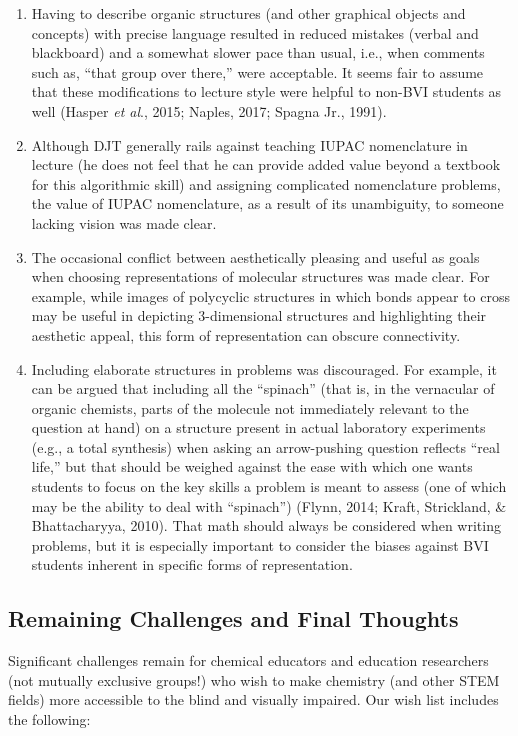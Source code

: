 \documentclass[11.5pt]{sig-alternate} %
\begin{document}
\begin{large}
\begin{enumerate}
    \item Having to describe organic structures (and other graphical objects and concepts) with precise language resulted in reduced mistakes (verbal and blackboard) and a somewhat slower pace than usual, i.e., when comments such as, “that group over there,” were acceptable. It seems fair to assume that these modifications to lecture style were helpful to non-BVI students as well (Hasper \textit{et al}., 2015; Naples, 2017; Spagna Jr., 1991).
    \item Although DJT generally rails against teaching IUPAC nomenclature in lecture (he does not feel that he can provide added value beyond a textbook for this algorithmic skill) and assigning complicated nomenclature problems, the value of IUPAC nomenclature, as a result of its unambiguity, to someone lacking vision was made clear.
    \item The occasional conflict between aesthetically pleasing and useful as goals when choosing representations of molecular structures was made clear. For example, while images of polycyclic structures in which bonds appear to cross may be useful in depicting 3-dimensional structures and highlighting their aesthetic appeal, this form of representation can obscure connectivity.
    \item Including elaborate structures in problems was discouraged. For example, it can be argued that including all the “spinach” (that is, in the vernacular of organic chemists, parts of the molecule not immediately relevant to the question at hand) on a structure present in actual laboratory experiments (e.g., a total synthesis) when asking an arrow-pushing question reflects “real life,” but that should be weighed against the ease with which one wants students to focus on the key skills a problem is meant to assess (one of which may be the ability to deal with “spinach”) (Flynn, 2014; Kraft, Strickland, \& Bhattacharyya, 2010). That math should always be considered when writing problems, but it is especially important to consider the biases against BVI students inherent in specific forms of representation.
 \end{enumerate}

\subsection*{Remaining Challenges and Final Thoughts}

Significant challenges remain for chemical educators and education researchers (not mutually exclusive groups!) who wish to make chemistry (and other STEM fields) more accessible to the blind and visually impaired. Our wish list includes the following:


\end{large}
\end{document}
